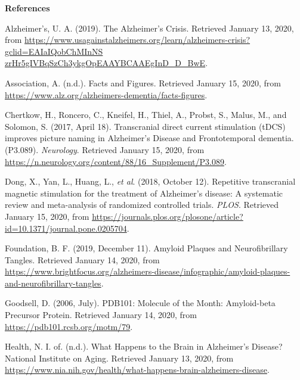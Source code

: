 \newpage
\noindent
\textbf{References}
\begingroup
\renewcommand{\section}[2]{}%
\begin{thebibliography}{9}
Alzheimer's, U. A. (2019). The Alzheimer's Crisis. Retrieved January 13, 2020, from
\url{https://www.usagainstalzheimers.org/learn/alzheimers-crisis?gclid=EAIaIQobChMInNS
zrHr5gIVBqSzCh3ykgOpEAAYBCAAEgInD_D_BwE}.

Association, A. (n.d.). Facts and Figures. Retrieved January 15, 2020, from
\url{https://www.alz.org/alzheimers-dementia/facts-figures}.

Chertkow, H., Roncero, C., Kneifel, H., Thiel, A., Probst, S., Malus, M., and Solomon, S. (2017,
April 18). Transcranial direct current stimulation (tDCS) improves picture naming in
Alzheimer's Disease and Frontotemporal dementia. (P3.089). \textit{Neurology}. Retrieved January 15, 2020, from \url{https://n.neurology.org/content/88/16_Supplement/P3.089}.

Dong, X., Yan, L., Huang, L., \textit{et al}. (2018, October 12).
Repetitive transcranial magnetic stimulation for the treatment of Alzheimer's disease: A
systematic review and meta-analysis of randomized controlled trials. \textit{PLOS}. Retrieved January
15, 2020, from \url{https://journals.plos.org/plosone/article?id=10.1371/journal.pone.0205704}.

Foundation, B. F. (2019, December 11). Amyloid Plaques and Neurofibrillary Tangles. Retrieved
January 14, 2020, from \url{https://www.brightfocus.org/alzheimers-disease/infographic/amyloid-plaques-and-neurofibrillary-tangles}.

Goodsell, D. (2006, July). PDB101: Molecule of the Month: Amyloid-beta Precursor Protein.
Retrieved January 14, 2020, from \url{https://pdb101.rcsb.org/motm/79}.

Health, N. I. of. (n.d.). What Happens to the Brain in Alzheimer's Disease? National Institute on
Aging. Retrieved January 13, 2020, from \url{https://www.nia.nih.gov/health/what-happens-brain-alzheimers-disease}.


\end{thebibliography}

